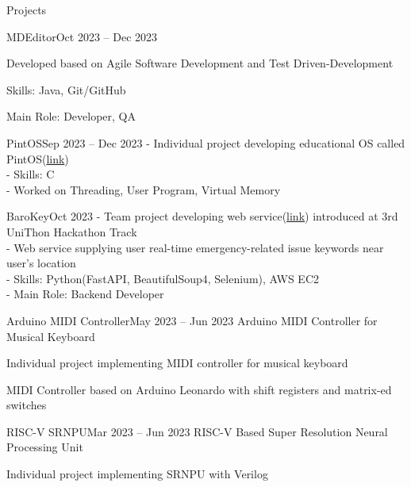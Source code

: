 \documentclass{resume}
\begin{document}
\begin{rSection}{Projects}
\begin{rSubsection}{MDEditor}{Oct 2023 -- Dec 2023}
        \item Developed based on Agile Software Development and Test Driven-Development

        \item Skills: Java, Git/GitHub

        \item Main Role: Developer, QA
    \end{rSubsection}
    
    \begin{rSubsection}{PintOS}{Sep 2023 -- Dec 2023}
        - Individual project developing educational OS called PintOS(\href{https://github.com/minsusun/csed312-pintos}{link}) \\
        - Skills: C \\
        - Worked on Threading, User Program, Virtual Memory
    \end{rSubsection}
    
    \begin{rSubsection}{BaroKey}{Oct 2023}
        - Team project developing web service(\href{https://github.com/UniD3-Hackathon-Team4/barokey}{link}) introduced at 3rd UniThon Hackathon Track \\
        - Web service supplying user real-time emergency-related issue keywords near user's location \\
        - Skills: Python(FastAPI, BeautifulSoup4, Selenium), AWS EC2 \\
        - Main Role: Backend Developer
    \end{rSubsection}

    \begin{rSubsection}{Arduino MIDI Controller}{May 2023 -- Jun 2023}
        Arduino MIDI Controller for Musical Keyboard

        \item Individual project implementing MIDI controller for musical keyboard

        \item MIDI Controller based on Arduino Leonardo with shift registers and matrix-ed switches
    \end{rSubsection}

    \begin{rSubsection}{RISC-V SRNPU}{Mar 2023 -- Jun 2023}
        RISC-V Based Super Resolution Neural Processing Unit

        \item Individual project implementing SRNPU with Verilog


\end{rSubsection}
\end{rSection}
\end{document}
